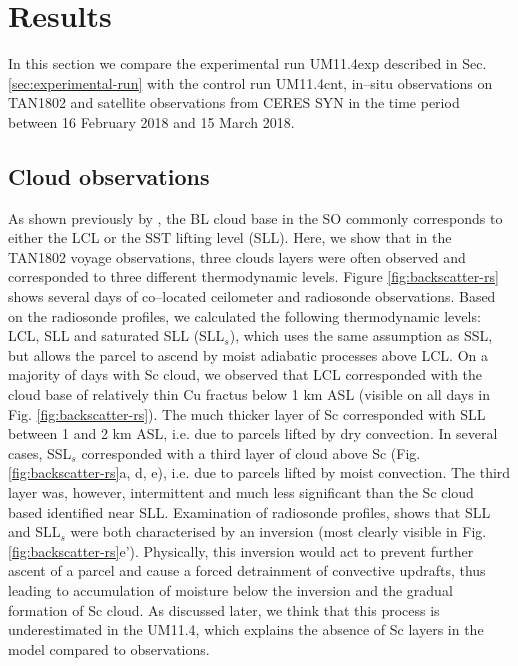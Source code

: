 \section{Results}
\label{sec:results}

In this section we compare the experimental run UM11.4exp described in Sec. \ref{sec:experimental-run} with the control run UM11.4cnt, in--situ observations on TAN1802 and satellite observations from CERES SYN \citep{loeb2018} in the time period between 16 February 2018 and 15 March 2018.

\subsection{Cloud observations}

As shown previously by \cite{kuma2020a}, the BL cloud base in the SO commonly
corresponds to either the LCL or the SST lifting level (SLL). Here, we show
that in the TAN1802 voyage observations, three clouds layers were often observed
and corresponded to three different thermodynamic levels. Figure
\ref{fig:backscatter-rs} shows several days of co--located ceilometer and
radiosonde observations. Based on the radiosonde profiles, we calculated the
following thermodynamic levels: LCL, SLL and saturated SLL (SLL$_s$), which
uses the same assumption as SSL, but allows the parcel to ascend by moist
adiabatic processes above LCL. On a majority of days with Sc cloud, we observed
that LCL corresponded with the cloud base of relatively thin Cu fractus
below 1 km ASL (visible on all days in Fig. \ref{fig:backscatter-rs}). The much thicker
layer of Sc corresponded with SLL between 1 and 2 km ASL, i.e. due to parcels lifted by dry convection.
In several cases, SSL$_s$ corresponded with a third layer of cloud above Sc
(Fig. \ref{fig:backscatter-rs}a, d, e), i.e. due to parcels lifted by moist
convection. The third layer was, however, intermittent and much less significant
than the Sc cloud based identified near SLL. Examination of radiosonde profiles, shows that SLL and SLL$_s$ were both characterised by an inversion (most clearly visible in Fig.
\ref{fig:backscatter-rs}e'). Physically, this inversion would act to prevent
further ascent of a parcel and cause a forced detrainment of convective updrafts,
thus leading to accumulation of moisture below the inversion and the gradual
formation of Sc cloud. As discussed later, we think that this process is
underestimated in the UM11.4, which explains the absence of Sc layers in the model compared to observations.

